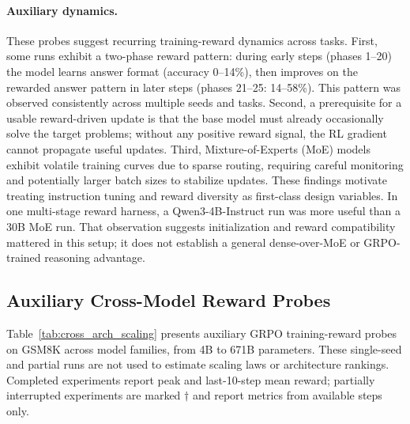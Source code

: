 \paragraph{Auxiliary dynamics.}
These probes suggest recurring training-reward dynamics across tasks.
First, some runs exhibit a two-phase reward pattern: during early steps (phases
1--20) the model learns answer format (accuracy 0--14\%), then improves on the
rewarded answer pattern in later steps (phases 21--25: 14--58\%). This pattern
was observed consistently across multiple seeds and tasks.
Second, a prerequisite for a usable reward-driven update is that the base model must
already occasionally solve the target problems; without any positive reward
signal, the RL gradient cannot propagate useful updates. Third, Mixture-of-Experts
(MoE) models exhibit volatile training curves due to sparse routing, requiring
careful monitoring and potentially larger batch sizes to stabilize updates.
These findings motivate treating instruction tuning and reward diversity as
first-class design variables. In one multi-stage reward harness, a
Qwen3-4B-Instruct run was more useful than a 30B MoE run. That observation
suggests initialization and reward compatibility mattered in this setup; it
does not establish a general dense-over-MoE or GRPO-trained reasoning
advantage.

\subsection{Auxiliary Cross-Model Reward Probes}
\label{sec:cross_arch_scaling}

Table~\ref{tab:cross_arch_scaling} presents auxiliary GRPO training-reward
probes on GSM8K across model families, from 4B to 671B parameters.  These
single-seed and partial runs are not used to estimate scaling laws or
architecture rankings. Completed experiments report peak and last-10-step
mean reward; partially interrupted experiments are marked $\dagger$ and report
metrics from available steps only.

